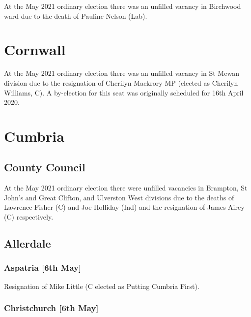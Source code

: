 \documentclass[a4paper,openany]{book}
\begin{document}
\begin{resultsiii}
At the May 2021 ordinary election there was an unfilled vacancy in Birchwood ward due to the death of Pauline Nelson (Lab).

\section{Cornwall}

At the May 2021 ordinary election there was an unfilled vacancy in St Mewan division due to the resignation of Cherilyn Mackrory MP (elected as Cherilyn Williams, C).  A by-election for this seat was originally scheduled for 16th April 2020.

\section{Cumbria}

\subsection*{County Council}

At the May 2021 ordinary election there were unfilled vacancies in Brampton, St John's and Great Clifton, and Ulverston West divisions due to the deaths of Lawrence Fisher (C) and Joe Holliday (Ind) and the resignation of James Airey (C) respectively.

\subsection*{Allerdale}

\subsubsection*{Aspatria \hspace*{\fill}\nolinebreak[1]%
	\enspace\hspace*{\fill}
	[6th May]}


Resignation of Mike Little (C elected as Putting Cumbria First).

\subsubsection*{Christchurch \hspace*{\fill}\nolinebreak[1]%
	\enspace\hspace*{\fill}
	[6th May]}


\end{resultsiii}
\end{document}
